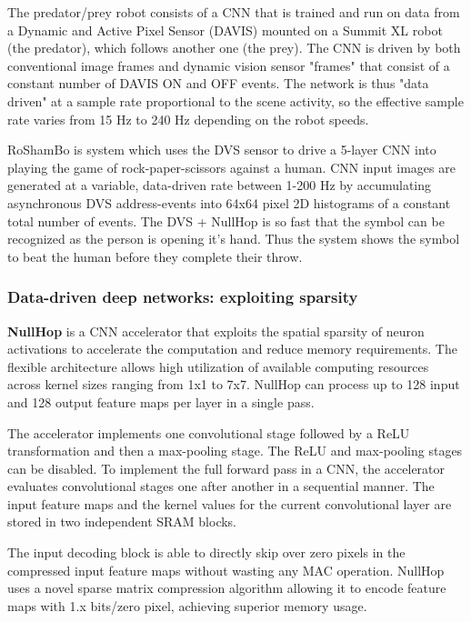 \documentclass[main]{subfiles}
\begin{document}
The predator/prey robot consists of a CNN that is trained and run on data from a Dynamic and Active Pixel Sensor (DAVIS) mounted on a Summit XL robot (the predator), which follows another one (the prey). The CNN is driven by both conventional image frames and dynamic vision sensor "frames" that consist of a constant number of DAVIS ON and OFF events. The network is thus "data driven" at a sample rate proportional to the scene activity, so the effective sample rate varies from 15 Hz to 240 Hz depending on the robot speeds. 

RoShamBo is system which uses the DVS sensor to drive a 5-layer CNN into playing the game of rock-paper-scissors against a human. CNN input images are generated at a variable, data-driven rate between 1-200 Hz by accumulating asynchronous DVS address-events into 64x64 pixel 2D histograms of a constant total number of events. The DVS + NullHop is so fast that the symbol can be recognized as the person is opening it's hand. Thus the system shows the symbol to beat the human before they complete their throw.

\subsubsection{Data-driven deep networks: exploiting sparsity}


\textbf{NullHop} is a CNN accelerator that exploits the spatial sparsity of neuron activations to accelerate the computation and reduce memory requirements. The flexible architecture allows high utilization of available computing resources across kernel sizes ranging from 1x1 to 7x7. NullHop can process up to 128 input and 128 output feature maps per layer in a single pass. 

The accelerator implements one convolutional stage followed by a ReLU transformation and then a max-pooling stage. The ReLU and max-pooling stages can be disabled. To implement the full forward pass in a CNN, the accelerator evaluates convolutional stages one after another in a sequential manner. The input feature maps and the kernel values for the current convolutional layer are stored in two independent SRAM blocks. 

The input decoding block is able to directly skip over zero pixels in the compressed input feature maps without wasting any MAC operation. NullHop uses a novel sparse matrix compression algorithm allowing it to encode feature maps with 1.x bits/zero pixel, achieving superior memory usage.
\end{document}
